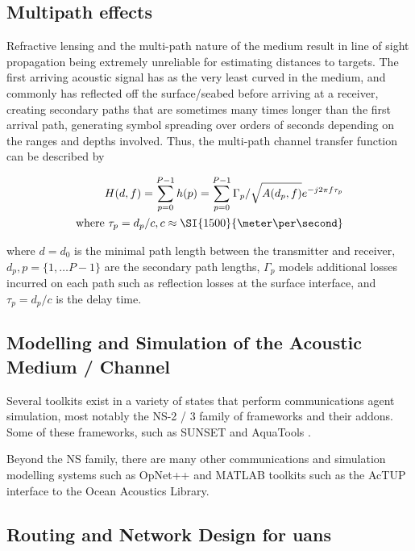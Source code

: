 \subsection{Multipath effects}

Refractive lensing and the multi-path nature of the medium result in line of sight propagation being extremely unreliable for estimating distances to targets.
The first arriving acoustic signal has as the very least curved in the medium, and commonly has reflected off the surface/seabed before arriving at a receiver, creating secondary paths that are sometimes many times longer than the first arrival path, generating symbol spreading over orders of seconds depending on the ranges and depths involved.
Thus, the multi-path channel transfer function can be described by 

\begin{align}
  \label{eq:acomultipath}
  H(d,f) =\sum_{p=0}^{P-1} h(p) = \sum_{p=0}^{P-1} \Gamma_p / \sqrt{A(d_p,f)}e^{-j 2 \pi f \tau_p} \\
  \text{where } \tau_p = d_p/c, c \approx \SI{1500}{\meter\per\second} \notag
\end{align}

where $d=d_0$ is the minimal path length between the transmitter and receiver, $d_p,p=\{1,\dots P-1\}$ are the secondary path lengths, $\Gamma_p$ models additional losses incurred on each path such as reflection losses at the surface interface, and $\tau_p = d_p/c$ is the delay time.




\subsection{Modelling and Simulation of the Acoustic Medium / Channel}

Several toolkits exist in a variety of states that perform communications agent simulation, most notably the NS-2 / 3 family of frameworks and their addons.
Some of these frameworks, such as SUNSET \cite{Petrioli2012a} and AquaTools \cite{Sehgal2010}.

Beyond the NS family, there are many other communications and simulation modelling systems such as OpNet++\cite{Chang1999} and MATLAB toolkits such as the AcTUP interface to the Ocean Acoustics Library.




\subsection{Routing and Network Design for \glspl{uan}}

